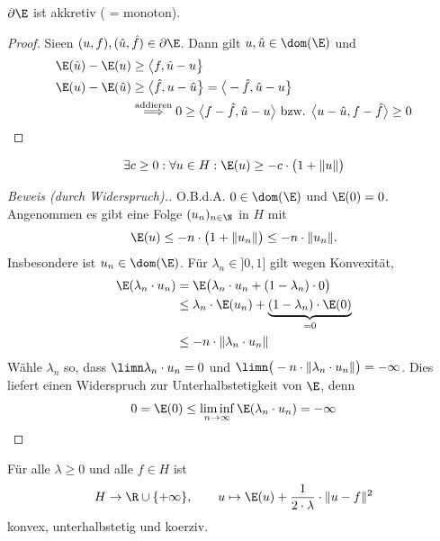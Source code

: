 \begin{lemma}
$\partial\E$ ist akkretiv ( = monoton).
\end{lemma}
\begin{proof}
Sieen $(u,f),(\hat{u},\hat{f})\in\partial\E$. Dann gilt $u,\hat{u}\in\dom(\E)$ und 
\begin{align*}
\E(\hat{u})-\E(u)&\geq\big\langle f,\hat{u}-u\big\rbrace\\
\E(u)-\E(\hat{u})&\geq\big\langle \hat{f},u-\hat{u}\big\rbrace=\big\langle-\hat{f},\hat{u}-u\big\rbrace\\
&\stackrel{\text{addieren}}{\implies}
0\geq\big\langle f-\hat{f},\hat{u}-u\big\rangle
\text{ bzw. }
\big\langle u-\hat{u},f-\hat{f}\big\rangle\geq0
\end{align*}
\end{proof}

\begin{lemma}
\begin{align*}
\exists c\geq0:\forall u\in H:\E(u)\geq -c\cdot\big(1+\Vert u\Vert\big)
\end{align*}
\end{lemma}
\begin{proof}[Beweis (durch Widerspruch).]\enter
O.B.d.A. $0\in\dom(\E)$ und $\E(0)=0$. Angenommen es gibt eine Folge $(u_n)_{n\in\N}$ in $H$ mit
\begin{align*}
\E(u)\leq -n\cdot\big(1+\Vert u_n\Vert\big)\leq -n\cdot\Vert u_n\Vert.
\end{align*}
Insbesondere ist $u_n\in\dom(\E)$. Für $\lambda_n\in]0,1]$ gilt wegen Konvexität,
\begin{align*}
\E(\lambda_n\cdot u_n)
&=\E\big(\lambda_n\cdot u_n+(1-\lambda_n)\cdot 0\big)\\
&\leq\lambda_n\cdot\E(u_n)+\underbrace{(1-\lambda_n)\cdot\E(0)}_{=0}\\
&\leq- n\cdot\Vert\lambda_n\cdot u_n\Vert
\end{align*}
Wähle $\lambda_n$ so, dass $\limn\lambda_n\cdot u_n=0$ und $\limn\big(-n\cdot\Vert\lambda_n\cdot u_n\Vert\big)=-\infty$. Dies liefert einen Widerspruch zur Unterhalbstetigkeit von $\E$, denn
\begin{align*}
0=\E(0)\leq\liminf\limits_{n\to\infty}\E(\lambda_n\cdot u_n)=-\infty
\end{align*}
\end{proof}

\begin{lemma}
Für alle $\lambda\geq0$ und alle $f\in H$ ist
\begin{align*}
H\to\R\cup\lbrace+\infty\rbrace,\qquad u\mapsto\E(u)+\frac{1}{2\cdot\lambda}\cdot\Vert u-f\Vert^2
\end{align*}
konvex, unterhalbstetig und koerziv.
\end{lemma}